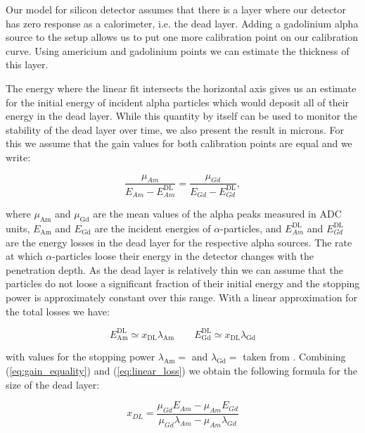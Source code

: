 \documentclass[a4paper,12pt]{article}
\begin{document}
Our model for silicon detector assumes that there is a layer where our detector
has zero response as a calorimeter, i.e. the dead layer. Adding a gadolinium alpha
source to the setup allows us to put one more calibration point on our
calibration curve. Using americium and gadolinium points we can estimate
the thickness of this layer.

The energy where the linear fit intersects the horizontal axis gives us an
estimate for the initial energy of incident alpha particles which would deposit
all of their energy in the dead layer. While this quantity by itself can be used
to monitor the stability of the dead layer over time, we also present the result
in microns. For this we assume that the gain values for both calibration points
are equal and we write:

\begin{equation}
\frac{\mu_{Am}}{E_{Am} - E^\text{DL}_{Am}} = \frac{\mu_{Gd}}{E_{Gd} - E^\text{DL}_{Gd}},
\label{eq:gain_equality}
\end{equation}

\noindent where $\mu_\text{Am}$ and $\mu_\text{Gd}$ are the mean values of the
alpha peaks measured in ADC units, $E_\text{Am}$ and $E_\text{Gd}$ are the
incident energies of $\alpha$-particles, and $E^\text{DL}_{Am}$ and
$E^\text{DL}_{Gd}$ are the energy losses in the dead layer for the respective
alpha sources. The rate at which $\alpha$-particles loose their energy in the
detector changes with the penetration depth. As the dead layer is relatively
thin we can assume that the particles do not loose a significant fraction of
their initial energy and the stopping power is approximately constant over this
range. With a linear approximation for the total losses we have:

\begin{equation}
E^\text{DL}_\text{Am} \simeq x_\text{DL} \lambda_\text{Am} \qquad
E^\text{DL}_\text{Gd} \simeq x_\text{DL} \lambda_\text{Gd}
\label{eq:linear_loss}
\end{equation}

\noindent
with values for the stopping power $\lambda_\text{Am} = $ and $\lambda_\text{Gd}
= $ taken from \cite{astar_database}. Combining (\ref{eq:gain_equality}) and
(\ref{eq:linear_loss}) we obtain the following formula for the size of the dead
layer:

\begin{equation}
x_{DL} = \frac{\mu_{Gd} E_{Am} - \mu_{Am} E_{Gd}}{\mu_{Gd}\lambda_{Am} - \mu_{Am}\lambda_{Gd}}
\label{eq:x_dl}
\end{equation}
\end{document}

